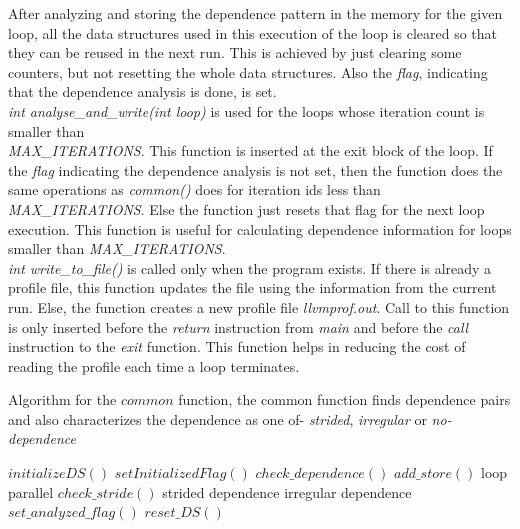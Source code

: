 \documentclass[10pt]{report}          %
\begin{document}
After analyzing and storing the dependence pattern in the memory for the given loop, all the data structures used in this execution of the loop is cleared so that they can be reused in the next run.  This is achieved by just clearing some counters, but not resetting the whole data structures.  Also the \textit{flag}, indicating that the dependence analysis is done, is set.\\
\textit{int analyse\_and\_write(int loop)} is used for the loops whose iteration count is smaller than \\ 
\textit{MAX\_ITERATIONS}.  This function is inserted at the exit block of the loop.  If the \textit{flag} indicating the dependence analysis is not set, then the function does the same operations as \textit{common()} does for iteration ids less than \textit{MAX\_ITERATIONS}.  Else the function just resets that flag for the next loop execution.  This function is useful for calculating dependence information for loops smaller than \textit{MAX\_ITERATIONS}.\\
\textit{int write\_to\_file()}  is called only when the program exists.  If there is already a profile file, this function updates the file using the information from the current run.  Else, the function creates a new profile file \textit{llvmprof.out}.  Call to this function is only inserted before the \textit{return} instruction from \textit{main} and before the \textit{call} instruction to the \textit{exit} function.  This function helps in reducing the cost of reading the profile each time a loop terminates.

\begin{algorithm}
\begin{algorithmic}[1]
\caption{Algorithm for the $common$ function, the common function finds dependence pairs and also characterizes the dependence as one of- \textit{strided}, \textit{irregular} or \textit{no-dependence}}
\label{alg:common_algo}
		\STATE $initializeDS()$
		\STATE $setInitializedFlag()$
	\ENDIF	
		\STATE $check\_dependence()$
	\ELSE
		\STATE $add\_store()$
	\ENDIF
\ELSE
			\STATE loop parallel
		\ELSE
			\STATE $check\_stride()$
				\STATE strided dependence
			\ELSE
				\STATE irregular dependence
			\ENDIF
		\ENDIF
		\STATE $set\_analyzed\_flag()$
		\STATE $reset\_DS()$
	\ENDIF
\ENDIF

\end{algorithmic}
\end{algorithm}
\end{document}
